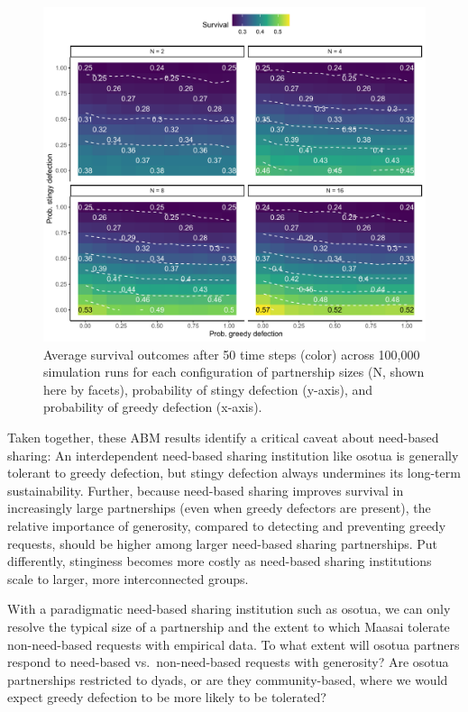 \documentclass[
]{article}
\begin{document}
\begin{figure}
\centering
\includegraphics{needBasedSharing-paper_files/figure-latex/abmplot1-1.pdf}
\caption{\label{fig:abmplot1}Average survival outcomes after 50 time steps (color) across 100,000 simulation runs for each configuration of partnership sizes (N, shown here by facets), probability of stingy defection (y-axis), and probability of greedy defection (x-axis).}
\end{figure}

Taken together, these ABM results identify a critical caveat about need-based sharing: An interdependent need-based sharing institution like osotua is generally tolerant to greedy defection, but stingy defection always undermines its long-term sustainability. Further, because need-based sharing improves survival in increasingly large partnerships (even when greedy defectors are present), the relative importance of generosity, compared to detecting and preventing greedy requests, should be higher among larger need-based sharing partnerships. Put differently, stinginess becomes more costly as need-based sharing institutions scale to larger, more interconnected groups.

With a paradigmatic need-based sharing institution such as osotua, we can only resolve the typical size of a partnership and the extent to which Maasai tolerate non-need-based requests with empirical data. To what extent will osotua partners respond to need-based vs.~non-need-based requests with generosity? Are osotua partnerships restricted to dyads, or are they community-based, where we would expect greedy defection to be more likely to be tolerated?
\end{document}
